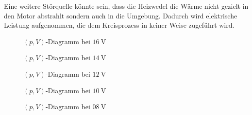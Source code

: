 Eine weitere Störquelle könnte sein, dass die Heizwedel die Wärme nicht gezielt in den Motor abstrahlt sondern auch in die Umgebung. Dadurch wird elektrische Leistung aufgenommen, die dem Kreisprozess in keiner Weise zugeführt wird.
\begin{figure}[h!]
	\centering
	
	\caption{$ (p,V) $-Diagramm bei $ \SI{16}{\volt} $}
	\label{fig:pV16}
\end{figure}
\begin{figure}[h!]
	\centering
	
	\caption{$ (p,V) $-Diagramm bei $ \SI{14}{\volt} $}
	\label{fig:pV14}
\end{figure}
\begin{figure}[h!]
	\centering
	
	\caption{$ (p,V) $-Diagramm bei $ \SI{12}{\volt} $}
	\label{fig:pV12}
\end{figure}
\begin{figure}[h!]
	\centering
	
	\caption{$ (p,V) $-Diagramm bei $ \SI{10}{\volt} $}
	\label{fig:pV10}
\end{figure}
\begin{figure}[h!]
	\centering
	
	\caption{$ (p,V) $-Diagramm bei $ \SI{08}{\volt} $}
	\label{fig:pV08}
\end{figure}

